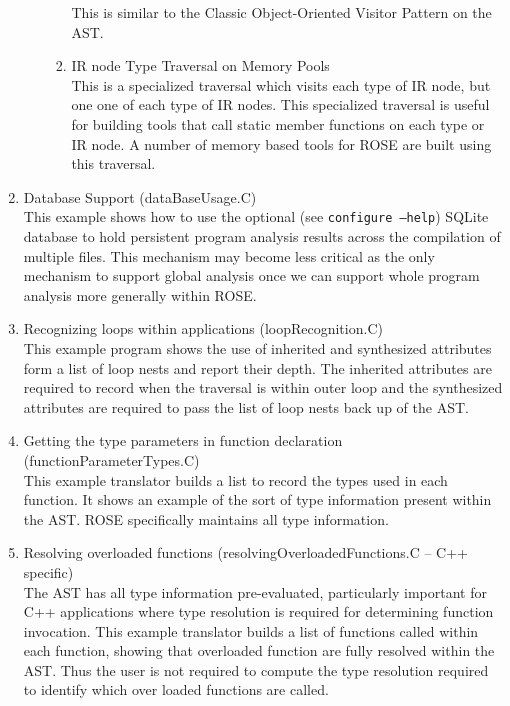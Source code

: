 \begin{enumerate}
\begin{enumerate}
\begin{enumerate}
              This is similar to the Classic Object-Oriented Visitor Pattern on the AST.
          \item IR node Type Traversal on Memory Pools \\
              This is a specialized traversal which visits each type of IR node, but one
              one of each type of IR nodes. This specialized traversal is useful for
              building tools that call static member functions on each type or IR node.
              A number of memory based tools for ROSE are built using this traversal.
        \end{enumerate}

     \end{enumerate}

     \item Database Support (dataBaseUsage.C) \\
           This example shows how to use the optional (see {\tt configure --help})
           SQLite database to hold persistent program analysis results across the
           compilation of multiple files. This mechanism may become less critical
           as the only mechanism to support global analysis once we can support
           whole program analysis more generally within ROSE.

     \item Recognizing loops within applications (loopRecognition.C) \\
           This example program shows the use of inherited and synthesized attributes
           form a list of loop nests and report their depth.  The inherited attributes are
           required to record when the traversal is within outer loop and the synthesized 
           attributes are required to pass the list of loop nests back up of the AST.

     \item Getting the type parameters in function declaration (functionParameterTypes.C) \\
           This example translator builds a list to record the types used in each
           function.  It shows an example of the sort of type information present 
           within the AST.  ROSE specifically maintains all type information.

     \item Resolving overloaded functions (resolvingOverloadedFunctions.C -- C++ specific) \\
           The AST has all type information pre-evaluated, particularly important for C++
           applications where type resolution is required for determining function
           invocation. This example translator builds a list of functions called within
           each function, showing that overloaded function are fully resolved within the
           AST.  Thus the user is not required to compute the type resolution required
           to identify which over loaded functions are called.


\end{enumerate}

